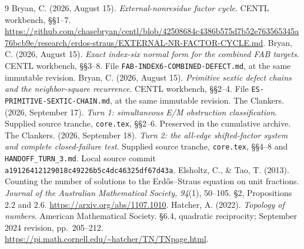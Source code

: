 \begin{thebibliography}{9}
 Bryan, C. (2026, August 15). \emph{External-nonresidue factor cycle}. CENTL workbench, \S\S1--7. \url{https://github.com/chasebryan/centl/blob/42508684c4386b575d7b52e763565345a76bcb9e/research/erdos-straus/EXTERNAL-NR-FACTOR-CYCLE.md}.
 Bryan, C. (2026, August 15). \emph{Exact index-six normal form for the combined FAB targets}. CENTL workbench, \S\S3--8. File \texttt{FAB-INDEX6-COMBINED-DEFECT.md}, at the same immutable revision.
 Bryan, C. (2026, August 15). \emph{Primitive sextic defect chains and the neighbor-square recurrence}. CENTL workbench, \S\S2--4. File \texttt{ES-PRIMITIVE-SEXTIC-CHAIN.md}, at the same immutable revision.
 The Clankers. (2026, September 17). \emph{Turn 1: simultaneous E/M obstruction classification}. Supplied source tranche, \texttt{core.tex}, \S\S2--6. Preserved in the cumulative archive.
 The Clankers. (2026, September 18). \emph{Turn 2: the all-edge shifted-factor system and complete closed-failure test}. Supplied source tranche, \texttt{core.tex}, \S\S4--8 and \texttt{HANDOFF\_TURN\_3.md}. Local source commit \texttt{a19126412129018c49226b5c4dc46325df67d43a}.
 Elsholtz, C., \& Tao, T. (2013). Counting the number of solutions to the Erd\H{o}s--Straus equation on unit fractions. \emph{Journal of the Australian Mathematical Society, 94}(1), 50--105. \S2, Propositions 2.2 and 2.6. \url{https://arxiv.org/abs/1107.1010}.
 Hatcher, A. (2022). \emph{Topology of numbers}. American Mathematical Society. \S6.4, quadratic reciprocity; September 2024 revision, pp.\ 205--212. \url{https://pi.math.cornell.edu/~hatcher/TN/TNpage.html}.
\end{thebibliography}
